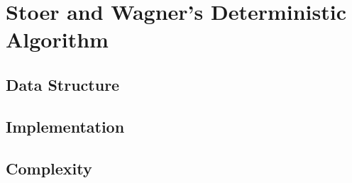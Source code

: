 \section{Stoer and Wagner's Deterministic Algorithm}\label{stoer}


\subsection{Data Structure}


\subsection{Implementation}



\subsection{Complexity}



\pagebreak